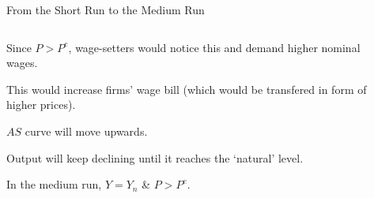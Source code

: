 \documentclass[shownotes,11pt, aspectratio=169]{beamer}
\newenvironment{wideitemize}{\itemize\addtolength{\itemsep}{10pt}}{\enditemize}
\begin{document}
\begin{frame}{From the Short Run to the Medium Run}
\begin{columns}[T] %
\begin{column}{.44\textwidth}
  \begin{wideitemize}
    \item Since $P > P^e$, wage-setters would notice this and demand higher nominal wages.
    \item This would increase firms' wage bill (which would be transfered in form of higher prices).
    \item $AS$ curve will move upwards.
    \item Output will keep declining until it reaches the `natural' level.
    \item In the medium run, $Y = Y_n$ \& $P > P^e$.
  \end{wideitemize}
\end{column}%
\pause
\hfill%
\begin{column}{.53\textwidth}
\end{column}%
\end{columns}
\end{frame}

\end{document}

